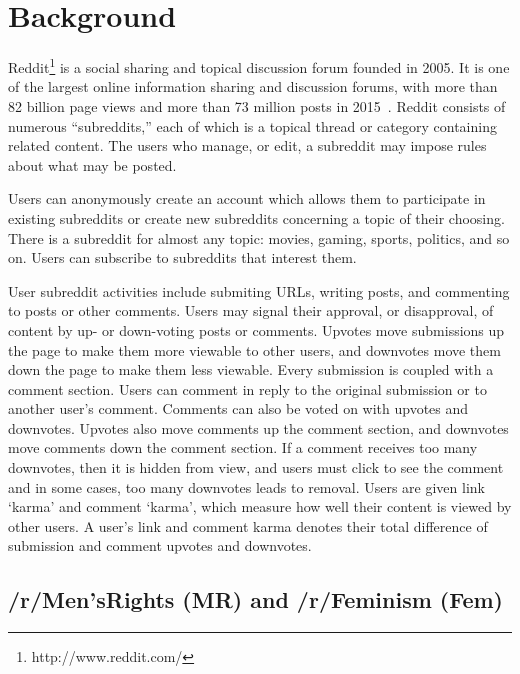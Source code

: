 \documentclass[letterpaper]{article}
\newcommand{\yy}[1]{{\textcolor{green}{yy: #1}}}
\newcommand{\del}[1]{{\textcolor{gray}{#1}}}
\begin{document}

\section{Background}

Reddit\footnote{http://www.reddit.com/} is a social sharing and topical discussion forum founded in 2005. It is one of the largest online information sharing and discussion forums, with more than 82 billion page views and more than 73 million posts in 2015~\cite{reddit2015Reddit2015}. Reddit consists of numerous ``subreddits,'' each of which is a topical thread or category containing related content. The users who manage, or edit, a subreddit may impose rules about what may be posted.
 
Users can anonymously create an account which allows them to participate in existing subreddits or create new subreddits concerning a topic of their choosing. There is a subreddit for almost any topic: movies, gaming, sports, politics, and so on. Users can subscribe to subreddits that interest them. 

User subreddit activities include submiting URLs, writing posts, and commenting to posts or other comments. Users may signal their approval, or disapproval, of content by up- or down-voting posts or comments. Upvotes move submissions up the page to make them more viewable to other users, and downvotes move them down the page to make them less viewable. Every submission is coupled with a comment section. Users can comment in reply to the original submission or to another user's comment. Comments can also be voted on with upvotes and downvotes. Upvotes also move comments up the comment section, and downvotes move comments down the comment section. If a comment receives too many downvotes, then it is hidden from view, and users must click to see the comment and in some cases, too many downvotes leads to removal. Users are given link `karma' and comment `karma', which measure how well their content is viewed by other users. A user's link and comment karma denotes their total difference of submission and comment upvotes and downvotes.  



\subsection{/r/Men'sRights (MR) and /r/Feminism (Fem)}
\end{document}
